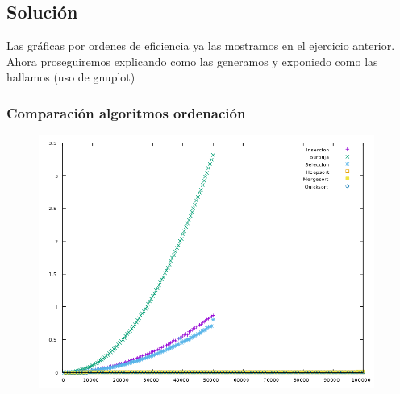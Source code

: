 \documentclass[compress]{beamer}
\begin{document}
\subsection{Solución}
\begin{frame}
Las gráficas por ordenes de eficiencia ya las mostramos en el ejercicio anterior. Ahora proseguiremos explicando como las generamos y exponiedo como las hallamos (uso de gnuplot)
\end{frame}
\begin{frame}
\frametitle{Comparación algoritmos ordenación}
	\begin{figure}
  \centering
    \includegraphics[width=0.98\textwidth]{Ordenacion.png}
  \label{fig:ejemplo}
\end{figure}
	
\end{frame}
\end{document}

